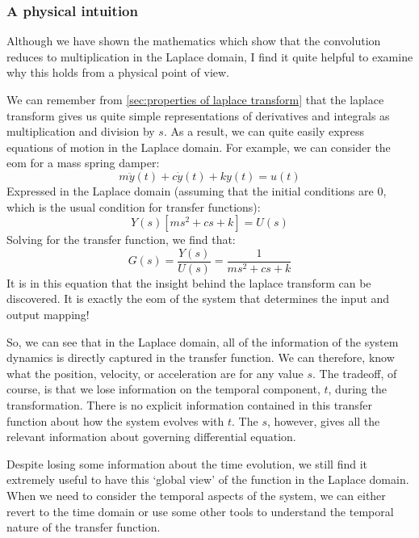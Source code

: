 \subsubsection{A physical intuition}
Although we have shown the mathematics which show that the convolution reduces to multiplication in the Laplace domain, I find it quite helpful to examine why this holds from a physical point of view.

We can remember from \autoref{sec:properties of laplace transform} that the \gls{laplace transform} gives us quite simple representations of derivatives and integrals as multiplication and division by $s$. As a result, we can quite easily express equations of motion in the Laplace domain. For example, we can consider the \gls{eom} for a mass spring damper:
$$m\ddot{y}(t)+c\dot{y}(t)+ky(t)=u(t)$$
Expressed in the Laplace domain (assuming that the initial conditions are $0$, which is the usual condition for transfer functions):
$$Y(s)\left[ms^2+cs+k\right]=U(s)$$
Solving for the transfer function, we find that:
$$G(s)=\frac{Y(s)}{U(s)}=\frac{1}{ms^2+cs+k}$$
It is in this equation that the insight behind the \gls{laplace transform} can be discovered. It is exactly the \gls{eom} of the system that determines the input and output mapping!

So, we can see that in the Laplace domain, all of the information of the system dynamics is directly captured in the transfer function. We can therefore, know what the position, velocity, or acceleration are for any value $s$. The tradeoff, of course, is that we lose information on the temporal component, $t$, during the transformation. There is no explicit information contained in this transfer function about how the system evolves with $t$. The $s$, however, gives all the relevant information about governing differential equation.

Despite losing some information about the time evolution, we still find it extremely useful to have this `global view' of the function in the Laplace domain. When we need to consider the temporal aspects of the system, we can either revert to the time domain or use some other tools to understand the temporal nature of the transfer function.

